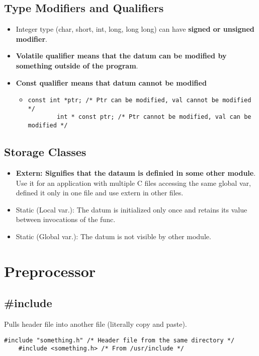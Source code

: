 \documentclass{article}
\begin{document}
\subsection{Type Modifiers and Qualifiers}
\begin{itemize}
    \item Integer type (char, short, int, long, long long) can have \textbf{signed or unsigned modifier}.
    \item \textbf{Volatile qualifier means that the datum can be modified by something outside of the program}.
    \item \textbf{Const qualifier means that datum cannot be modified}
    \begin{itemize}
        \item \begin{lstlisting}[style=CStyle]
        const int *ptr; /* Ptr can be modified, val cannot be modified */
        int * const ptr; /* Ptr cannot be modified, val can be modified */
        \end{lstlisting}
    \end{itemize}
\end{itemize}

\subsection{Storage Classes}
\begin{itemize}
    \item \textbf{Extern: Signifies that the dataum is definied in some other module}. 
    Use it for an application with multiple C files accessing the same global var, defined it only in one file and use extern in other files.
    \item Static (Local var.): The datum is initialized only once and retains its value between invocations of the func.
    \item Static (Global var.): The datum is not visible by other module.
\end{itemize}

\section{Preprocessor}

\subsection{\#include}
Pulls header file into another file (literally copy and paste).
\begin{lstlisting}[style=CStyle]
    #include "something.h" /* Header file from the same directory */
    #include <something.h> /* From /usr/include */
\end{lstlisting}
\end{document}
